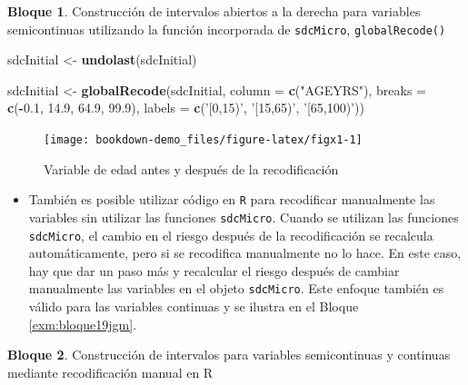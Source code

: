 \documentclass[]{book}
\newenvironment{Shaded}{\begin{snugshade}}{\end{snugshade}}
\newcommand{\DataTypeTok}[1]{\textcolor[rgb]{0.13,0.29,0.53}{#1}}
\newcommand{\FloatTok}[1]{\textcolor[rgb]{0.00,0.00,0.81}{#1}}
\newcommand{\KeywordTok}[1]{\textcolor[rgb]{0.13,0.29,0.53}{\textbf{#1}}}
\newcommand{\NormalTok}[1]{#1}
\newcommand{\OperatorTok}[1]{\textcolor[rgb]{0.81,0.36,0.00}{\textbf{#1}}}
\newcommand{\StringTok}[1]{\textcolor[rgb]{0.31,0.60,0.02}{#1}}
\providecommand{\tightlist}{%
  \setlength{\itemsep}{0pt}\setlength{\parskip}{0pt}}
\theoremstyle{definition}
\theoremstyle{definition}
\newtheorem{example}{Bloque}[chapter]
\theoremstyle{definition}
\theoremstyle{definition}
\theoremstyle{remark}
\begin{document}
\begin{example}
\protect\hypertarget{exm:bloque18jgm}{}{\label{exm:bloque18jgm} }Construcción de intervalos abiertos a la derecha para variables semicontinuas utilizando la función incorporada de \texttt{sdcMicro}, \texttt{globalRecode()}
\end{example}

\begin{Shaded}
\begin{Highlighting}[]
\NormalTok{sdcInitial <-}\StringTok{ }\KeywordTok{undolast}\NormalTok{(sdcInitial)}

\NormalTok{sdcInitial <-}\StringTok{ }\KeywordTok{globalRecode}\NormalTok{(sdcInitial, }\DataTypeTok{column =} \KeywordTok{c}\NormalTok{(}\StringTok{"AGEYRS"}\NormalTok{),}
                           \DataTypeTok{breaks =} \KeywordTok{c}\NormalTok{(}\OperatorTok{-}\FloatTok{0.1}\NormalTok{, }\FloatTok{14.9}\NormalTok{, }\FloatTok{64.9}\NormalTok{, }\FloatTok{99.9}\NormalTok{),}
                           \DataTypeTok{labels =} \KeywordTok{c}\NormalTok{(}\StringTok{'[0,15)'}\NormalTok{, }\StringTok{'[15,65)'}\NormalTok{, }\StringTok{'[65,100)'}\NormalTok{))}
\end{Highlighting}
\end{Shaded}

\begin{figure}
\texttt{[image: bookdown-demo\_files/figure-latex/figx1-1]} \caption{Variable de edad antes y después de la recodificación}\label{fig:figx1}
\end{figure}

\begin{itemize}
\tightlist
\item
  También es posible utilizar código en \texttt{R} para recodificar manualmente las variables sin utilizar las funciones \texttt{sdcMicro}. Cuando se utilizan las funciones \texttt{sdcMicro}, el cambio en el riesgo después de la recodificación se recalcula automáticamente, pero si se recodifica manualmente no lo hace. En este caso, hay que dar un paso más y recalcular el riesgo después de cambiar manualmente las variables en el objeto \texttt{sdcMicro}. Este enfoque también es válido para las variables continuas y se ilustra en el Bloque \ref{exm:bloque19jgm}.
\end{itemize}

\begin{example}
\protect\hypertarget{exm:bloque19jgm}{}{\label{exm:bloque19jgm} }Construcción de intervalos para variables semicontinuas y continuas mediante recodificación manual en R
\end{example}
\end{document}
